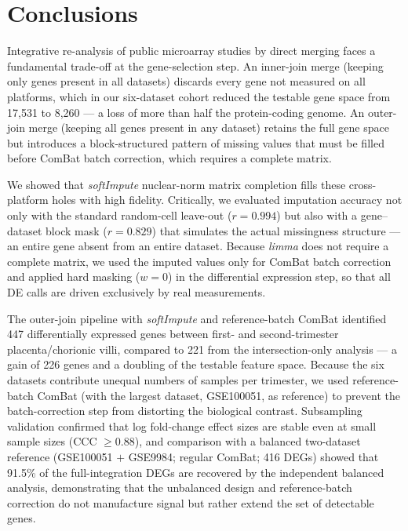 \documentclass[11pt,a4paper]{article}
\begin{document}
\section{Conclusions}

Integrative re-analysis of public microarray studies by direct
merging faces a fundamental trade-off at the gene-selection
step. An inner-join merge (keeping only genes present in all
datasets) discards every gene not measured on all platforms,
which in our six-dataset cohort reduced the testable gene
space from 17{,}531 to 8{,}260 --- a loss of more than half
the protein-coding genome. An outer-join merge (keeping all
genes present in any dataset) retains the full gene space but
introduces a block-structured pattern of missing values that
must be filled before ComBat batch correction, which requires
a complete matrix.

We showed that \textit{softImpute} nuclear-norm matrix
completion fills these cross-platform holes with high fidelity.
Critically, we evaluated imputation accuracy not only with the
standard random-cell leave-out ($r = 0.994$) but also with a
gene--dataset block mask ($r = 0.829$) that simulates the
actual missingness structure --- an entire gene absent from an
entire dataset. Because \textit{limma} does not require a
complete matrix, we used the imputed values only for ComBat
batch correction and applied hard masking ($w = 0$) in the
differential expression step, so that all DE calls are driven
exclusively by real measurements.

The outer-join pipeline with \textit{softImpute} and
reference-batch ComBat identified 447 differentially expressed
genes between first- and second-trimester placenta/chorionic villi, compared to
221 from the intersection-only analysis --- a gain of 226 genes
and a doubling of the testable feature space. Because the six
datasets contribute unequal numbers of samples per trimester, we
used reference-batch ComBat (with the largest dataset,
GSE100051, as reference) to prevent the batch-correction step
from distorting the biological contrast. Subsampling validation
confirmed that log fold-change effect sizes are stable even at
small sample sizes (CCC $\ge 0.88$), and comparison with a
balanced two-dataset reference (GSE100051 $+$ GSE9984; regular
ComBat; 416 DEGs) showed that 91.5\% of the full-integration
DEGs are recovered by the independent balanced analysis,
demonstrating that the unbalanced design and reference-batch
correction do not manufacture signal but rather extend the set
of detectable genes.
\end{document}
